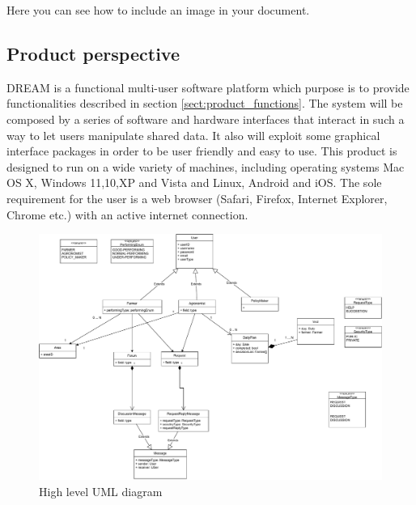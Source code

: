 Here you can see how to include an image in your document.


\subsection{Product perspective}
DREAM is a functional multi-user software platform which purpose is to provide functionalities described in section \ref{sect:product_functions}. The system will be composed by a series of software and hardware interfaces that interact in such a way to let users manipulate shared data. It also will exploit some graphical interface packages in order to be user friendly and easy to use.
This product is designed to run on a wide variety of machines, including operating systems Mac OS X, Windows 11,10,XP and Vista and Linux, Android and iOS. The sole requirement for the user is a web browser (Safari, Firefox, Internet Explorer, Chrome etc.) with an active internet connection.

\begin{figure}[H]
	\centering
    \includegraphics[page=1, width=\textwidth]{Images/SE2 - class diagram.pdf}
	\caption{\label{fig:uml_class_diagram}High level UML diagram}
\end{figure}

